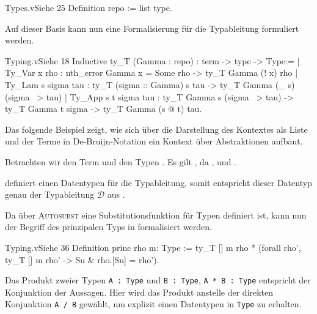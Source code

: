 \begin{code}[repo]{Types.v}{Siehe }{25}
Definition repo := list type.
\end{code}

Auf dieser Basis kann nun eine Formalisierung für die Typableitung formuliert werden.

\begin{code}[ty_T]{Typing.v}{Siehe }{18}
Inductive ty_T (Gamma : repo) : term -> type -> Type:=
  | Ty_Var x rho : nth_error Gamma x = Some rho ->
                ty_T Gamma (! x) rho
  | Ty_Lam s sigma tau : ty_T (sigma :: Gamma) s tau ->
                ty_T Gamma (\_ s) (sigma ~> tau)
  | Ty_App s t sigma tau : ty_T Gamma s (sigma ~> tau) -> ty_T Gamma t sigma ->
                ty_T Gamma (s @ t) tau.
\end{code}

Das folgende Beispiel zeigt, wie sich über die Darstellung des Kontextes als Liste und der Terme in De-Bruijn-Notation ein Kontext über Abstraktionen aufbaut.

\begin{example}{}{}
Betrachten wir den Term  und den Typen . Es gilt , da ,  und .
\end{example}
\begin{remark}
     definiert einen Datentypen für die Typableitung, somit entspricht dieser Datentyp genau der Typableitung $\mathcal{D}$ aus .
\end{remark}

Da über \textsc{Autosubst} eine Substitutionsfunktion für Typen definiert ist, kann nun der Begriff des prinzipalen Typs in  formalisiert werden.
\begin{code}[princ]{Typing.v}{Siehe }{36}
Definition princ rho m: Type :=
    ty_T [] m rho * (forall rho', ty_T [] m rho' -> {Su & rho.[Su] = rho'}).
\end{code}
\begin{remark}
    Das Produkt zweier Typen \texttt{A : Type} und \texttt{B : Type},  \texttt{A * B : Type} entspricht der Konjunktion der Aussagen. Hier wird das Produkt anstelle der direkten Konjunktion \texttt{A /\ B} gewählt, um explizit einen Datentypen in \texttt{Type} zu erhalten.
\end{remark}

